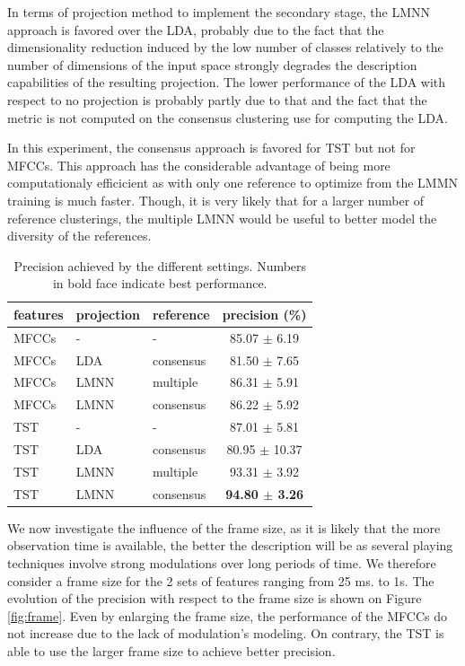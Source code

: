 \documentclass{article}
\begin{document}
In terms of projection method to implement the secondary stage, the LMNN approach is favored over the LDA, probably due to the fact that the dimensionality reduction induced by the low number of classes relatively to the number of dimensions of the input space strongly degrades the description capabilities of the resulting projection. The lower performance of the LDA with respect to no projection is probably partly due to that and the fact that the metric is not computed on the consensus clustering use for computing the LDA.

In this experiment, the consensus approach is favored for TST but not for MFCCs. This approach has the considerable advantage of being more computationaly efficicient as with only one reference to optimize from the LMMN training is much faster. Though, it is very likely that for a larger number of reference clusterings, the multiple LMNN would be useful to better model the diversity of the references.


\begin{table}
  \caption{Precision achieved by the different settings. Numbers in bold face indicate best performance.}
  \label{tab:res1}
  \begin{center}
\begin{tabular}{lllc}
features & projection & reference & precision (\%) \\
  \hline
  MFCCs & - & - &   85.07 $\pm$ 6.19 \\
  MFCCs & LDA &  consensus  &   81.50 $\pm$ 7.65 \\
MFCCs & LMNN & multiple & 86.31 $\pm$ 5.91 \\
MFCCs & LMNN & consensus &   86.22 $\pm$ 5.92 \\
TST & - & - &   87.01 $\pm$ 5.81 \\
TST & LDA & consensus &   80.95 $\pm$ 10.37 \\
TST & LMNN  & multiple  &   93.31 $\pm$ 3.92 \\
TST & LMNN & consensus &   \textbf{94.80 $\pm$ 3.26} \\
\end{tabular}
\end{center}
\end{table}

We now investigate the influence of the frame size, as it is likely that the more observation time is available, the better the description will be as several playing techniques involve strong modulations over long periods of time. We therefore consider a frame size for the 2 sets of features ranging from 25 ms. to 1s. The evolution of the precision with respect to the frame size is shown on Figure \ref{fig:frame}. Even by enlarging the frame size, the performance of the MFCCs do not increase due to the lack of modulation's modeling. On contrary, the TST is able to use the larger frame size to achieve better precision.
\end{document}
